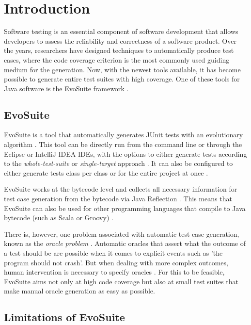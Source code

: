 \section{Introduction} 

Software testing is an essential component of software development that allows developers to assess the reliability and correctness of a software product.
Over the years, researchers have designed techniques to automatically produce test cases, where the code coverage criterion is the most commonly used guiding medium for the generation. 
Now, with the newest tools available, it has become possible to generate entire test suites with high coverage. 
One of these tools for Java software is the EvoSuite  framework \cite{FRASER2013}.

\subsection{EvoSuite} \label{evosuite}

EvoSuite is a tool that automatically generates JUnit tests with an evolutionary algorithm \cite{JUNIT,FRASER2013}. 
This tool can be directly run from the command line or through the Eclipse or IntelliJ IDEA IDEs, with the options to either generate tests according to the \textit{whole-test-suite} or \textit{single-target} approach \cite{FRASER2013}. 
It can also be configured to either generate tests class per class or for the entire project at once \cite{EVOSUITECLI}.

EvoSuite works at the bytecode level and collects all necessary information for test case generation from the bytecode via Java Reflection \cite{FRASER2013}. 
This means that EvoSuite can also be used for other programming languages that compile to Java bytecode (such as Scala or Groovy) \cite{VENNERS2008,SUBRAMANIAM2008}. 

There is, however, one problem associated with automatic test case generation, known as the \textit{oracle problem} \cite{BARR2015}. 
Automatic oracles that assert what the outcome of a test should be are possible when it comes to explicit events such as 'the program should not crash'. 
But when dealing with more complex outcomes, human intervention is necessary to specify oracles \cite{FRASER2013}. 
For this to be feasible, EvoSuite aims not only at high code coverage but also at small test suites that make manual oracle generation as easy as possible. 

\subsection{Limitations of EvoSuite}

